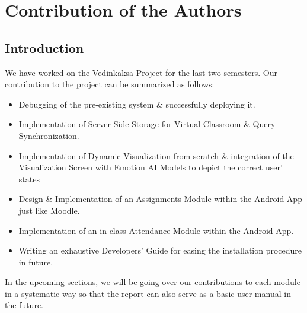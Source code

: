 \documentclass[10pt]{report}
\begin{document}
\chapter{Contribution of the Authors}
\section{Introduction}
We have worked on the Vedinkaksa Project for the last two semesters. Our contribution to the project can be summarized as follows:
\begin{itemize}
\item{Debugging of the pre-existing system \& successfully deploying it.}
\item{Implementation of Server Side Storage for Virtual Classroom \& Query Synchronization.}
\item{Implementation of Dynamic Visualization from scratch \& integration of the Visualization Screen with Emotion AI Models to depict the correct user' states}
\item{Design \& Implementation of an Assignments Module within the Android App just like Moodle.}
\item{Implementation of an in-class Attendance Module within the Android App.}
\item{Writing an exhaustive Developers' Guide for easing the installation procedure in future.}
\end{itemize}  
In the upcoming sections, we will be going over our contributions to each module in a systematic way so that the report can also serve as a basic user manual in the future.  
\end{document}

